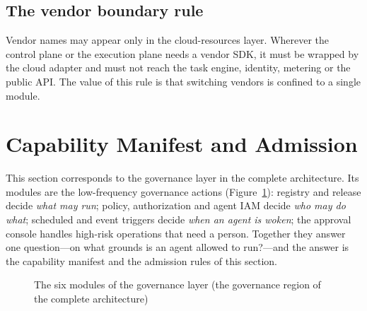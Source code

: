 \subsection{The vendor boundary rule}

Vendor names may appear only in the cloud-resources layer. Wherever the control plane or the execution plane needs a vendor SDK, it must be wrapped by the cloud adapter and must not reach the task engine, identity, metering or the public API. The value of this rule is that switching vendors is confined to a single module.

\section{Capability Manifest and Admission}
\label{sec:profile}

This section corresponds to the governance layer in the complete architecture. Its modules are the low-frequency governance actions (Figure~\ref{fig:zoom-control}): registry and release decide \emph{what may run}; policy, authorization and agent IAM decide \emph{who may do what}; scheduled and event triggers decide \emph{when an agent is woken}; the approval console handles high-risk operations that need a person. Together they answer one question---on what grounds is an agent allowed to run?---and the answer is the capability manifest and the admission rules of this section.

\begin{figure}[htbp]
\centering
{}
\caption[The governance layer]{The six modules of the governance layer (the governance region of the complete architecture)}
\label{fig:zoom-control}
\end{figure}

